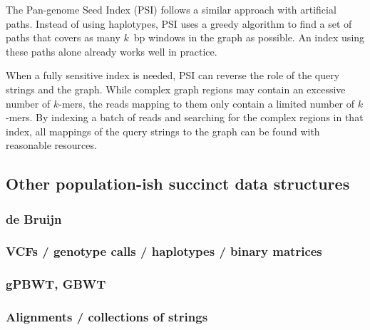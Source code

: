 The Pan-genome Seed Index (PSI) \cite{Ghaffaari_2019} follows a similar approach with artificial paths.
Instead of using haplotypes, PSI uses a greedy algorithm to find a set of paths that covers as many $k$~bp windows in the graph as possible.
An index using these paths alone already works well in practice.

When a fully sensitive index is needed, PSI can reverse the role of the query strings and the graph.
While complex graph regions may contain an excessive number of $k$-mers, the reads mapping to them only contain a limited number of $k$-mers.
By indexing a batch of reads and searching for the complex regions in that index, all mappings of the query strings to the graph can be found with reasonable resources.


\subsection{Other population-ish succinct data structures}

\subsubsection{de Bruijn}


\subsubsection{VCFs / genotype calls / haplotypes / binary matrices}

\subsubsection{gPBWT, GBWT}



\subsubsection{Alignments / collections of strings}




